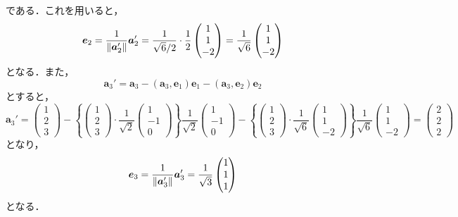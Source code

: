 \documentclass[a4paper,10pt,fleqn]{ltjsarticle}
\begin{document}
\begin{tleftbar}
\[    \]
    である．これを用いると，
    \[
        \bm{e}_2 = \frac{1}{\norm{\bm{a}_2'}} \bm{a}_2 ' =\frac{1}{\sqrt{6}/2} \cdot \frac{1}{2} \begin{pmatrix} 1 \\ 1\\ -2 \end{pmatrix} = \frac{1}{\sqrt{6}} \begin{pmatrix} 1 \\ 1\\ -2 \end{pmatrix}
    \]
    となる．また，
    \[
        \bm{a}_3 ' = \bm{a}_3 - (\bm{a}_3,\bm{e}_1)\bm{e}_1 -(\bm{a}_3,\bm{e}_2)\bm{e}_2
    \]
    とすると，
    \[
        \bm{a}_3'  = \begin{pmatrix} 1 \\ 2 \\ 3 \end{pmatrix} - \left \{ \begin{pmatrix} 1 \\ 2\\ 3 \end{pmatrix} \cdot \frac{1}{\sqrt{2}} \begin{pmatrix} 1 \\ -1 \\ 0 \end{pmatrix} \right \} \frac{1}{\sqrt{2}} \begin{pmatrix} 1 \\ -1 \\ 0 \end{pmatrix}- \left \{ \begin{pmatrix} 1 \\ 2 \\ 3 \end{pmatrix} \cdot  \frac{1}{\sqrt{6}} \begin{pmatrix} 1 \\ 1\\ -2 \end{pmatrix} \right \}  \frac{1}{\sqrt{6}} \begin{pmatrix} 1 \\ 1\\ -2 \end{pmatrix} =\begin{pmatrix} 2 \\ 2 \\ 2 \end{pmatrix}
    \]
    となり，
    \[
        \bm{e}_3 = \frac{1}{\norm{\bm{a}_3 ' }} \bm{a}_3 ' = \frac{1}{\sqrt{3}} \begin{pmatrix} 1 \\ 1 \\ 1 \end{pmatrix}
    \]
    となる．


\end{tleftbar}
\end{document}
